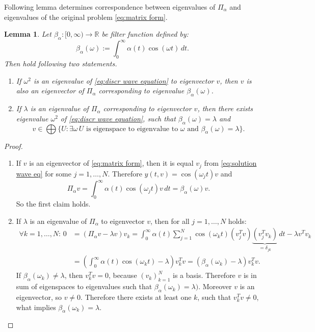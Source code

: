 \documentclass[a4paper,11pt,bibliography=totoc,listof=totoc,headinclude=true,cleardoublepage=empty,oneside]{scrbook}
\newtheorem{lemma}[theorem]{Lemma}
\newcommand{\R}{\mathbb{R}}
\begin{document}
Following lemma determines correspondence between eigenvalues of $\Pi_\alpha$ and eigenvalues of the original problem \eqref{eq:matrix form}.
\begin{lemma}
    Let $\beta_\alpha : [0, \infty) \rightarrow \R$ be filter function defined by:
    \begin{equation}\label{eq:cont filter function}
        \beta_\alpha(\omega) := \int_0^\infty \alpha(t) \cos(\omega t) \,dt. 
    \end{equation}
    Then hold following two statements.
    \begin{enumerate}
        \item If $\omega^2$ is an eigenvalue of \eqref{eq:discr wave equation} to eigenvector $v$, then $v$ is also an eigenvector of $\Pi_\alpha$ corresponding to eigenvalue $\beta_\alpha(\omega)$. 
        \item If $\lambda$ is an eigenvalue of $\Pi_\alpha$ corresponding to eigenvector $v$, then there exists eigenvalue $\omega^2$ of \eqref{eq:discr wave equation}, such that $\beta_\alpha (\omega) = \lambda$ and 
        \begin{equation*}
            v \in \bigoplus\{ U : \exists \omega \, U \text{ is eigenspace to eigenvalue to } \omega \text{ and } \beta_\alpha(\omega) = \lambda\}.
        \end{equation*}
    \end{enumerate}
\end{lemma}
\begin{proof}
    \begin{enumerate}
        \item If $v$ is an eigenvector of \eqref{eq:matrix form}, then it is equal $v_j$ from \eqref{eq:solution wave eq} for some $j=1, \dots, N$. Therefore $y(t, v) = \cos(\omega_j t)v$ and 
        \begin{equation*}
            \Pi_\alpha v = \int_0^\infty \alpha(t) \cos(\omega_j t) v \, dt = \beta_\alpha(\omega) v.
        \end{equation*}
        So the first claim holds.
        \item If $\lambda$ is an eigenvalue of $\Pi_\alpha$ to eigenvector $v$, then for all $j=1, \dots, N$ holds:
        \begin{align*}
            \forall k =1, \dots, N:\, 0 &= (\Pi_\alpha v - \lambda v)v_k = \int_0^\infty \alpha(t) \sum_{j=1}^N \cos(\omega_k t) (v_j^T v)\underbrace{(v_j^T v_k)}_{=\delta_{jk}} \, dt - \lambda v^Tv_k \\ &= \left(\int_0^\infty \alpha(t) \cos(\omega_kt) - \lambda \right)v_k^T v = (\beta_\alpha(\omega_k) - \lambda)v_k^T v.
        \end{align*}
        If $\beta_\alpha (\omega_k)\neq \lambda$, then $v_k^Tv = 0$, because $(v_k)_{k=1}^N$ is a basis. Therefore $v$ is in sum of eigenspaces to eigenvalues such that $\beta_\alpha(\omega_k) = \lambda)$. Moreover $v$ is an eigenvector, so $v\neq 0$. Therefore there exists at least one $k$, such that $v_k^T v \neq 0$, what implies $\beta_\alpha (\omega_k) = \lambda$. 
    \end{enumerate}
\end{proof}
\end{document}
